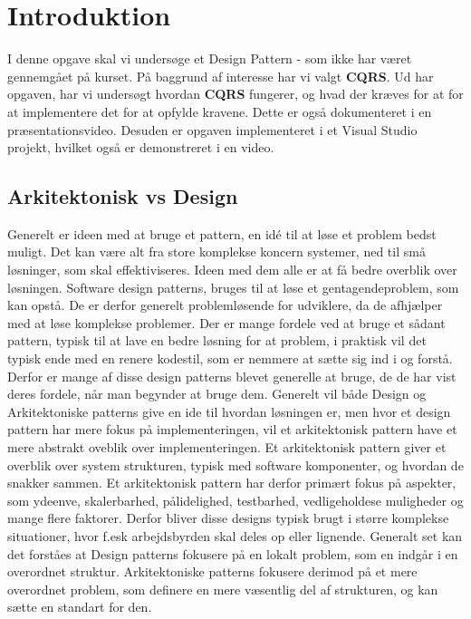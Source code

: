 \chapter{Introduktion}
I denne opgave skal vi undersøge et Design Pattern - som ikke har været gennemgået på kurset. 
På baggrund af interesse har vi valgt \textbf{CQRS}. Ud har opgaven, har vi undersøgt hvordan \textbf{CQRS} fungerer, og hvad der kræves for at for at implementere det for at opfylde kravene. Dette er også dokumenteret i en præsentationsvideo.
Desuden er opgaven implementeret i et Visual Studio projekt, hvilket også er demonstreret i en video.

\section{Arkitektonisk vs Design}
Generelt er ideen med at bruge et pattern, en idé til at løse et problem bedst muligt. Det kan være alt fra store komplekse koncern systemer, ned til små løsninger, som skal effektiviseres. Ideen med dem alle er at få bedre overblik over løsningen.
\newline
Software design patterns, bruges til at løse et gentagendeproblem, som kan opstå. De er derfor generelt problemløsende for udviklere, da de afhjælper med at løse komplekse problemer.
Der er mange fordele ved at bruge et sådant pattern, typisk til at lave en bedre løsning for at problem, i praktisk vil det typisk ende med en renere kodestil, som er nemmere at sætte sig ind i og forstå. Derfor er mange af disse design patterns blevet generelle at bruge, de de har vist deres fordele, når man begynder at bruge dem.
\newline
Generelt vil både Design og Arkitektoniske patterns give en ide til hvordan løsningen er, men hvor et design pattern har mere fokus på implementeringen, vil et arkitektonisk pattern have et mere abstrakt oveblik over implementeringen.
Et arkitektonisk pattern giver et overblik over system strukturen, typisk med software komponenter, og hvordan de snakker sammen. Et arkitektonisk pattern har derfor primært fokus på aspekter, som ydeenve, skalerbarhed, pålidelighed, testbarhed, vedligeholdese muligheder og mange flere faktorer. Derfor bliver disse designs typisk brugt i større komplekse situationer, hvor f.esk arbejdsbyrden skal deles op eller lignende. 
\newline
Generalt set kan det forståes at Design patterns fokusere på en lokalt problem, som en indgår i en overordnet struktur. Arkitektoniske patterns fokusere derimod på et mere overordnet problem, som definere en mere væsentlig del af strukturen, og kan sætte en standart for den.

